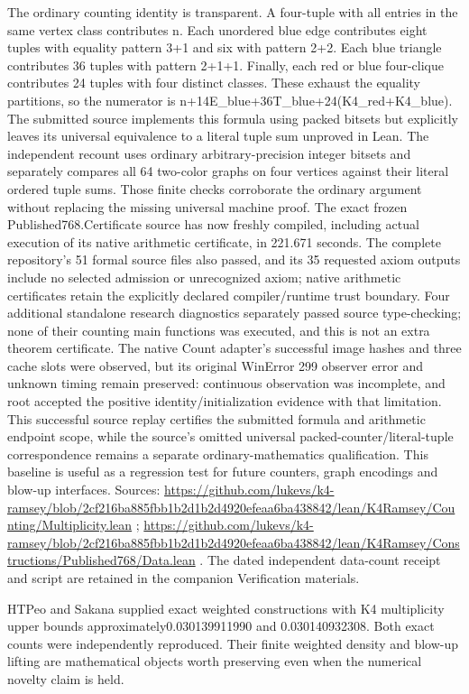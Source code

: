 \documentclass[11pt,a4paper]{article}
\begin{document}
The ordinary counting identity is transparent. A four-tuple with all entries in the same vertex class contributes n. Each unordered blue edge contributes eight tuples with equality pattern 3+1 and six with pattern 2+2. Each blue triangle contributes 36 tuples with pattern 2+1+1. Finally, each red or blue four-clique contributes 24 tuples with four distinct classes. These exhaust the equality partitions, so the numerator is n+14E\_blue+36T\_blue+24(K4\_red+K4\_blue). The submitted source implements this formula using packed bitsets but explicitly leaves its universal equivalence to a literal tuple sum unproved in Lean. The independent recount uses ordinary arbitrary-precision integer bitsets and separately compares all 64 two-color graphs on four vertices against their literal ordered tuple sums. Those finite checks corroborate the ordinary argument without replacing the missing universal machine proof. The exact frozen Published768.Certificate source has now freshly compiled, including actual execution of its native arithmetic certificate, in 221.671 seconds. The complete repository's 51 formal source files also passed, and its 35 requested axiom outputs include no selected admission or unrecognized axiom; native arithmetic certificates retain the explicitly declared compiler/runtime trust boundary. Four additional standalone research diagnostics separately passed source type-checking; none of their counting main functions was executed, and this is not an extra theorem certificate. The native Count adapter's successful image hashes and three cache slots were observed, but its original WinError 299 observer error and unknown timing remain preserved: continuous observation was incomplete, and root accepted the positive identity/initialization evidence with that limitation. This successful source replay certifies the submitted formula and arithmetic endpoint scope, while the source's omitted universal packed-counter/literal-tuple correspondence remains a separate ordinary-mathematics qualification. This baseline is useful as a regression test for future counters, graph encodings and blow-up interfaces. Sources: \url{https://github.com/lukevs/k4-ramsey/blob/2cf216ba885fbb1b2d1b2d4920efeaa6ba438842/lean/K4Ramsey/Counting/Multiplicity.lean} ; \url{https://github.com/lukevs/k4-ramsey/blob/2cf216ba885fbb1b2d1b2d4920efeaa6ba438842/lean/K4Ramsey/Constructions/Published768/Data.lean} . The dated independent data-count receipt and script are retained in the companion Verification materials.

HTPeo and Sakana supplied exact weighted constructions with K4 multiplicity upper bounds approximately0.030139911990 and 0.030140932308. Both exact counts were independently reproduced. Their finite weighted density and blow-up lifting are mathematical objects worth preserving even when the numerical novelty claim is held.
\end{document}

